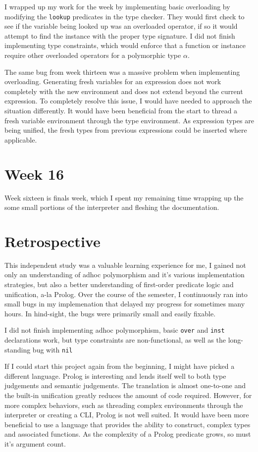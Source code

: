 \documentclass[11pt,a4paper]{article}
\begin{document}
I wrapped up my work for the week by implementing basic overloading by modifying
the \verb|lookup| predicates in the type checker. They would first check to see
if the variable being looked up was an overloaded operator, if so it would attempt
to find the instance with the proper type signature. I did not finish implementing
type constraints, which would enforce that a function or instance require
other overloaded operators for a polymorphic type $\alpha$.

The same bug from week thirteen was a massive problem when implementing overloading.
Generating fresh variables for an expression does not work completely with the
new environment and does not extend beyond the current expression. To completely
resolve this issue, I would have needed to approach the situation differently. It
would have been beneficial from the start to thread a fresh variable environment
through the type environment. As expression types are being unified, the fresh
types from previous expressions could be inserted where applicable.


\section*{Week 16}

Week sixteen is finals week, which I spent my remaining time wrapping up the
some small portions of the interpreter and fleshing the documentation.


\section*{Retrospective}

This independent study was a valuable learning experience for me, I gained not
only an understanding of adhoc polymorphism and it's various implementation
strategies, but also a better understanding of first-order predicate logic and
unification, a-la Prolog. Over the course of the semester, I continuously ran
into small bugs in my implemenation that delayed my progress for sometimes many
hours. In hind-sight, the bugs were primarily small and easily fixable.

I did not finish implementing adhoc polymorphism, basic \verb|over| and
\verb|inst| declarations work, but type constraints are non-functional, as well
as the long-standing bug with \verb|nil|

If I could start this project again from the beginning, I might have picked a
different language. Prolog is interesting and lends itself well to both
type judgements and semantic judgements. The translation is almost one-to-one
and the built-in unification greatly reduces the amount of code required.
However, for more complex behaviors, such as threading complex environments
through the interpreter or creating a CLI, Prolog is not well suited. It would
have been more beneficial to use a language that provides the ability to
construct, complex types and associated functions. As the complexity of a
Prolog predicate grows, so must it's argument count.
\end{document}
